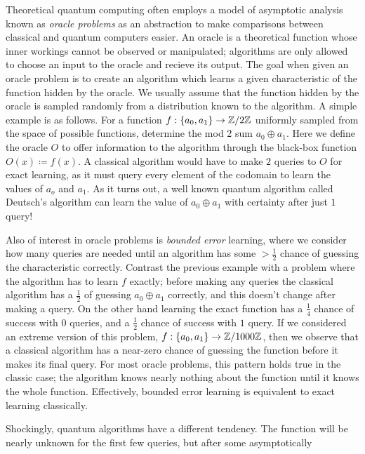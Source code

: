 \documentclass[12pt,twoside]{reedthesis}
\theoremstyle{plain}   %
\theoremstyle{definition}
\theoremstyle{remark}
\numberwithin{equation}{section}
\begin{document}
  Theoretical quantum computing often employs a model
  of asymptotic analysis known as \emph{oracle problems} as an abstraction to make comparisons between classical and quantum computers easier.
  An oracle is a theoretical function whose inner workings cannot be observed or manipulated; algorithms are only allowed to choose an input to the oracle and recieve its output.
  The goal when given an oracle problem is to create an algorithm which learns a given characteristic of the function hidden by the oracle.
  We usually assume that the function hidden by the oracle is sampled randomly from a distribution known to the algorithm.
  A simple example is as follows. For a function $f: \{a_0, a_1 \} \to \mathbb{Z} / 2\mathbb{Z}$ uniformly sampled from the space of possible functions, determine the mod $2$ sum $a_0 \oplus a_1$.
  Here we define the oracle $O$ to offer information to the algorithm through the black-box function $O(x) \coloneq f(x)$.
  A classical algorithm would have to make $2$ queries to $O$ for exact learning, as it must query every element of the codomain to learn the values of $a_o$ and $a_1$.
  As it turns out, a well known quantum algorithm called Deutsch's algorithm can learn the value of $a_0 \oplus a_1$ with certainty after just $1$ query! \par
  Also of interest in oracle problems is \emph{bounded error} learning, where we consider how many queries are needed until an algorithm has some $> \frac{1}{2}$ chance of guessing the characteristic correctly.
  Contrast the previous example with a problem where the algorithm has to learn $f$ exactly; before making any queries the classical algorithm has a $\frac{1}{2}$ of guessing $a_0 \oplus a_1$ correctly,
  and this doesn't change after making a query. On the other hand learning the exact function has a $\frac{1}{4}$ chance of success with $0$ queries, and a $\frac{1}{2}$ chance of success with $1$ query.
  If we considered an extreme version of this problem, $f: \{a_0, a_1 \} \to \mathbb{Z} / 1000\mathbb{Z}$, then we observe that a classical algorithm has a near-zero chance of guessing the function before it makes its final query.
  For most oracle problems, this pattern holds true in the classic case; the algorithm knows nearly nothing about the function until it knows the whole function.
  Effectively, bounded error learning is equivalent to exact learning classically. \par
  Shockingly, quantum algorithms have a different tendency.
  The function will be nearly unknown for the first few queries, but after some asymptotically 
\end{document}
